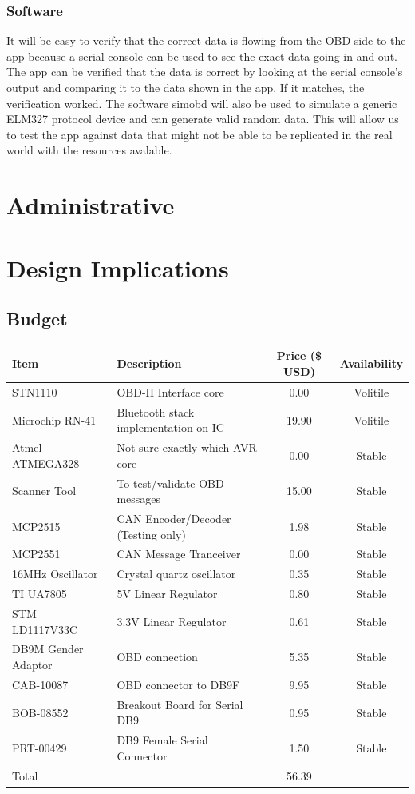 \documentclass[12pt,letterpaper]{article}
\begin{document}
\subsubsection{Software}
It will be easy to verify that the correct data is flowing from the OBD side to the app because a serial console can be used to see the exact data going in and out. The app can be verified that the data is correct by looking at the serial console's output and comparing it to the data shown in the app. If it matches, the verification worked. The software simobd will also be used to simulate a generic ELM327 protocol device and can generate valid random data. This will allow us to test the app against data that might not be able to be replicated in the real world with the resources avalable. 

\newpage

\section{Administrative}


\newpage

\section{Design Implications}
\subsection{Budget}
\begin{tabular}{| l | p{7cm} | c | c |}
\hline
Item & Description & Price (\$ USD) & Availability \\ \hline
STN1110 & OBD-II Interface core & 0.00 & Volitile \\ \hline
Microchip RN-41 & Bluetooth stack implementation on IC & 19.90 & Volitile \\ \hline
Atmel ATMEGA328 & Not sure exactly which AVR core & 0.00 & Stable \\ \hline
Scanner Tool & To test/validate OBD messages & 15.00 & Stable\\ \hline
MCP2515 & CAN Encoder/Decoder (Testing only) & 1.98 & Stable\\ \hline
MCP2551 & CAN Message Tranceiver & 0.00 & Stable\\ \hline
16MHz Oscillator & Crystal quartz oscillator & 0.35 & Stable \\ \hline
TI UA7805 & 5V Linear Regulator & 0.80 & Stable \\ \hline
STM LD1117V33C & 3.3V Linear Regulator & 0.61 & Stable \\ \hline 
DB9M Gender Adaptor & OBD connection & 5.35 & Stable \\ \hline
CAB-10087 & OBD connector to DB9F & 9.95 & Stable \\ \hline
BOB-08552 & Breakout Board for Serial DB9 & 0.95 & Stable \\ \hline
PRT-00429 & DB9 Female Serial Connector & 1.50 & Stable \\ \hline
\hline
Total && 56.39 & \\ \hline
\end{tabular}
\end{document}
